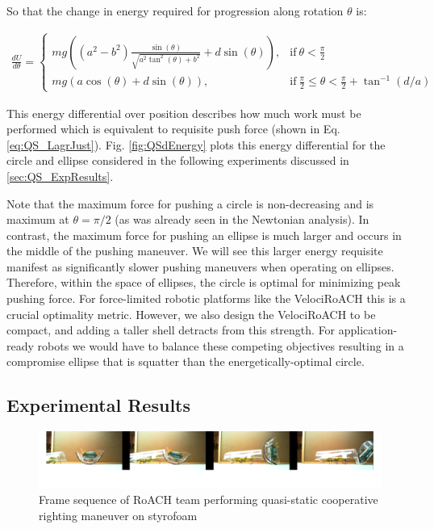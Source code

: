 \documentclass[letterpaper, 10 pt, conference]{ieeeconf}
\begin{document}
So that the change in energy required for progression along rotation $\theta$ is:

\begin{align}
  \frac{d U}{d \theta} =
  \begin{cases}
    mg ( (a^2 - b^2) \frac{\sin(\theta)}{\sqrt{a^2 \tan^2(\theta) + b^2}} + d \sin(\theta) ), & \text{if}\ \theta < \frac{\pi}{2} \\
    mg (a \cos(\theta) + d \sin(\theta) ), & \text{if}\ \frac{\pi}{2} \leq \theta < \frac{\pi}{2} + \tan^{-1}(d/a)
  \end{cases}
  \label{eq:QSdEnergy}
\end{align}

This energy differential over position describes how much work must be performed which is equivalent to requisite push force (shown in Eq. \ref{eq:QS_LagrJust}).
Fig. \ref{fig:QSdEnergy} plots this energy differential for the circle and ellipse considered in the following experiments discussed in \ref{sec:QS_ExpResults}.

Note that the maximum force for pushing a circle is non-decreasing and is maximum at $\theta = \pi/2$ (as was already seen in the Newtonian analysis).
In contrast, the maximum force for pushing an ellipse is much larger and occurs in the middle of the pushing maneuver.
We will see this larger energy requisite manifest as significantly slower pushing maneuvers when operating on ellipses.
Therefore, within the space of ellipses, the circle is optimal for minimizing peak pushing force.
For force-limited robotic platforms like the VelociRoACH this is a crucial optimality metric.
However, we also design the VelociRoACH to be compact, and adding a taller shell detracts from this strength.
For application-ready robots we would have to balance these competing objectives resulting in a compromise ellipse that is squatter than the energetically-optimal circle.

\subsection{Experimental Results \label{sec:QS_ExpResults}}
\begin{figure}[ht]
\centering
\includegraphics[width=1.0\columnwidth]{QSFlipStrip3.png}
\caption{Frame sequence of RoACH team performing quasi-static cooperative righting maneuver on styrofoam}
\end{figure}
\end{document}
